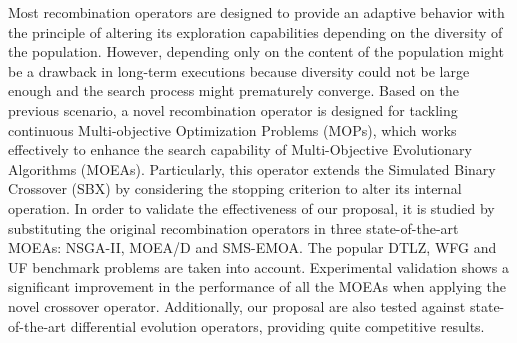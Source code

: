 Most recombination operators are designed to provide an adaptive behavior with the principle of altering its exploration capabilities depending on the diversity of the population.
%
However, depending only on the content of the population might be a drawback in long-term executions because diversity could not be large enough and the search process might prematurely converge.
%
Based on the previous scenario, a novel recombination operator is designed for tackling continuous Multi-objective Optimization Problems (MOPs), which works effectively to enhance the search capability of Multi-Objective Evolutionary Algorithms (MOEAs).
%
Particularly, this operator extends the Simulated Binary Crossover (SBX) by considering the stopping criterion to alter its internal operation.
%
In order to validate the effectiveness of our proposal, it is studied by substituting the original recombination operators in  three state-of-the-art MOEAs: NSGA-II, MOEA/D and SMS-EMOA.
%
The popular DTLZ, WFG and UF benchmark problems are taken into account.
%
Experimental validation shows a significant improvement in the performance of all the MOEAs when applying the novel crossover operator.
%
Additionally, our proposal are also tested against state-of-the-art differential evolution operators, providing quite competitive results.
%